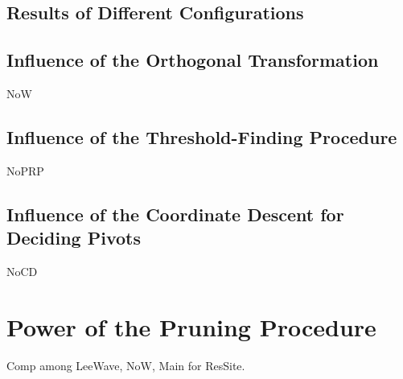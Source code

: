 

\subsection{Results of Different Configurations} %
\label{sub:results_of_different_configs}




\subsection{Influence of the Orthogonal Transformation} %
\label{ss:influence_of_the_orthogonal_transformation}

NoW

\subsection{Influence of the Threshold-Finding Procedure} %
\label{sub:influence_of_the_threshold_finding_procedure}

NoPRP

\subsection{Influence of the Coordinate Descent for Deciding Pivots} %
\label{sub:influence_of_the_decision_of_pivots}

NoCD


\section{Power of the Pruning Procedure} %
\label{s:power_of_the_pruning_procedure}

Comp among LeeWave, NoW, Main for ResSite.




%
%